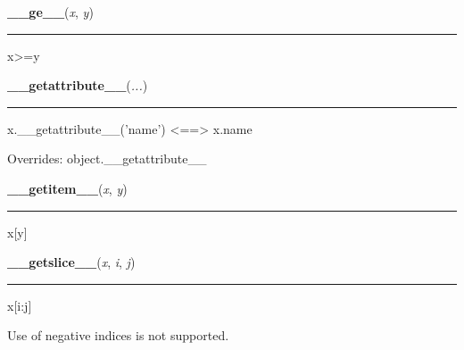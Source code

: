     \begin{boxedminipage}{\textwidth}

    \raggedright \textbf{\_\_ge\_\_}(\textit{x}, \textit{y})

    \vspace{-1.5ex}

    \rule{\textwidth}{0.5\fboxrule}

x{\textgreater}=y
    \vspace{1ex}

    \end{boxedminipage}

    \vspace{0.5ex}

    \begin{boxedminipage}{\textwidth}

    \raggedright \textbf{\_\_getattribute\_\_}(\textit{...})

    \vspace{-1.5ex}

    \rule{\textwidth}{0.5\fboxrule}

x.{\_}{\_}getattribute{\_}{\_}('name') {\textless}=={\textgreater} x.name
    \vspace{1ex}

      Overrides: object.\_\_getattribute\_\_

    \end{boxedminipage}

    \label{list:__getitem__}

    \vspace{0.5ex}

    \begin{boxedminipage}{\textwidth}

    \raggedright \textbf{\_\_getitem\_\_}(\textit{x}, \textit{y})

    \vspace{-1.5ex}

    \rule{\textwidth}{0.5\fboxrule}

x{[}y{]}
    \vspace{1ex}

    \end{boxedminipage}

    \label{list:__getslice__}

    \vspace{0.5ex}

    \begin{boxedminipage}{\textwidth}

    \raggedright \textbf{\_\_getslice\_\_}(\textit{x}, \textit{i}, \textit{j})

    \vspace{-1.5ex}

    \rule{\textwidth}{0.5\fboxrule}

x{[}i:j{]}

Use of negative indices is not supported.
    \vspace{1ex}

    \end{boxedminipage}

